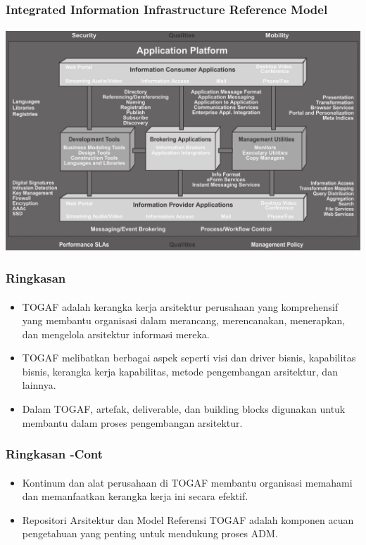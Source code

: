 \documentclass[aspectratio=169, table]{beamer}
\begin{document}
	{
		\begin{frame}
			\frametitle{Integrated Information Infrastructure Reference Model}
			\framesubtitle{\hspace{1cm}}
			\begin{center}
				\includegraphics[width=.90\textwidth]{../figures/integrated_information_infrastructure_reference_model}
			\end{center}
		\end{frame}
	}
	
	\begin{frame}
		\frametitle{Ringkasan}
		\framesubtitle{\hspace{1cm}}
		\begin{itemize}
			\item TOGAF adalah kerangka kerja arsitektur perusahaan yang komprehensif yang membantu organisasi dalam merancang, merencanakan, menerapkan, dan mengelola arsitektur informasi mereka.
			\item TOGAF melibatkan berbagai aspek seperti visi dan driver bisnis, kapabilitas bisnis, kerangka kerja kapabilitas, metode pengembangan arsitektur, dan lainnya.
			\item Dalam TOGAF, artefak, deliverable, dan building blocks digunakan untuk membantu dalam proses pengembangan arsitektur.
		\end{itemize}
	\end{frame}
	
		\begin{frame}
		\frametitle{Ringkasan -Cont}
		\framesubtitle{\hspace{1cm}}
		\begin{itemize}
			\item Kontinum dan alat perusahaan di TOGAF membantu organisasi memahami dan memanfaatkan kerangka kerja ini secara efektif.
			\item Repositori Arsitektur dan Model Referensi TOGAF adalah komponen acuan pengetahuan yang penting untuk mendukung proses ADM.
		\end{itemize}
	\end{frame}
	
	
\end{document}
